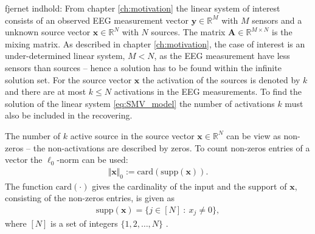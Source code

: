 fjernet indhold:
From chapter \ref{ch:motivation} the linear system of interest consists of an observed EEG measurement vector $\mathbf{y} \in \mathbb{R}^M$ with $M$ sensors and a unknown source vector $\mathbf{x} \in \mathbb{R}^N$ with $N$ sources. 
The matrix $\mathbf{A} \in \mathbb{R}^{M \times N}$ is the mixing matrix.
As described in chapter \ref{ch:motivation}, the case of interest is an under-determined linear system, $M < N$, as the EEG measurement have less sensors than sources -- hence a solution has to be found within the infinite solution set. 
For the source vector $\mathbf{x}$ the activation of the sources is denoted by $k$ and there are at most $k \leq N$ activations in the EEG measurements. 
To find the solution of the linear system \eqref{eq:SMV_model} the number of activations $k$ must also be included in the recovering.

The number of $k$ active source in the source vector $\mathbf{x} \in \mathbb{R}^N$ can be view as non-zeros -- the non-activations are described by zeros. To count non-zeros entries of a vector the $\ell_0$-norm can be used:
\begin{align*}
\Vert \mathbf{x} \Vert_0 := \text{card}(\text{supp}(\mathbf{x})).
\end{align*}
The function $\text{card}(\cdot)$ gives the cardinality of the input and the support of $\mathbf{x}$, consisting of the non-zeros entries, is given as
\begin{align*}
\text{supp}(\mathbf{x}) = \{ j \in [N] \ : \ x_j \neq 0 \},
\end{align*} 
where $[N]$ is a set of integers $\lbrace 1, 2, \hdots, N \rbrace$ \cite[p. 41]{FR}. 

